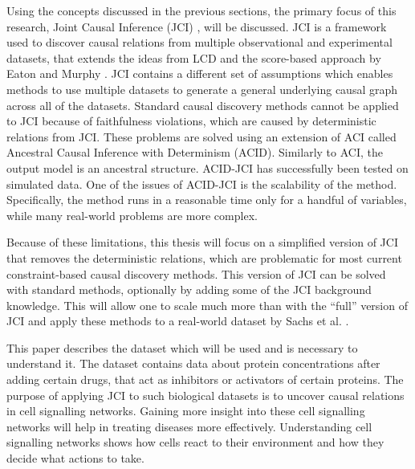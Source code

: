 \documentclass[a4paper,pdf]{article}
\begin{document}
Using the concepts discussed in the previous sections, the primary focus of this research, Joint Causal Inference (JCI) \cite{jci}, will be discussed. JCI is a framework used to discover causal relations from multiple observational and experimental datasets, that extends the ideas from LCD and the score-based approach by Eaton and Murphy \cite{eaton2007exact}. JCI contains a different set of assumptions which enables methods to use multiple datasets to generate a general underlying causal graph across all of the datasets. Standard causal discovery methods cannot be applied to JCI because of faithfulness violations, which are caused by deterministic relations from JCI. These problems are solved using an extension of ACI called Ancestral Causal Inference with Determinism (ACID). 
Similarly to ACI, the output model is an ancestral structure. ACID-JCI has successfully been tested on simulated data. One of the issues of ACID-JCI is the scalability of the method. Specifically, the method runs in a reasonable time only for a handful of variables, while many real-world problems are more complex. 

Because of these limitations, this thesis will focus on a simplified version of JCI that removes the deterministic relations, which are problematic for most current constraint-based causal discovery methods.
This version of JCI can be solved with standard methods, optionally by adding some of the JCI background knowledge. This will allow one to scale much more than with the ``full'' version of JCI and apply these methods to a real-world dataset by Sachs et al. \cite{sachs2005causal}.

This paper describes the dataset which will be used and is necessary to understand it.  The dataset contains data about protein concentrations after adding certain drugs, that act as inhibitors or activators of certain proteins. The purpose of applying JCI to such biological datasets is to uncover causal relations in cell signalling networks. Gaining more insight into these cell signalling networks will help in treating diseases more effectively. Understanding cell signalling networks shows how cells react to their environment and how they decide what actions to take.
\end{document}
